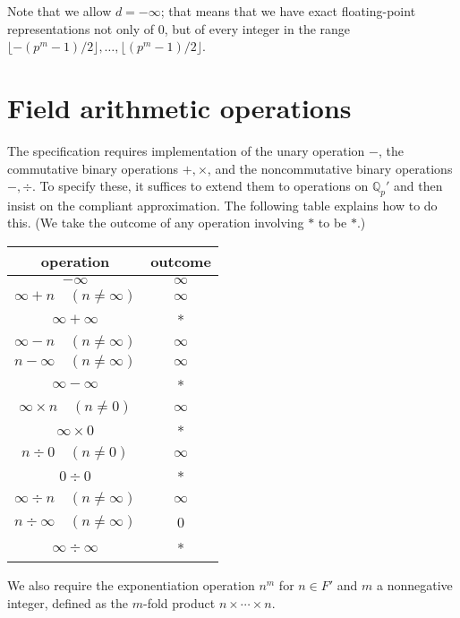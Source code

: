 \documentclass[12pt]{article}
\def\QQ{\mathbb{Q}}
\begin{document}
Note that we allow $d = -\infty$; that means that we have exact floating-point
representations not only of $0$, but of every integer in the range
$\lfloor -(p^{m}-1)/2 \rfloor, \dots, \lfloor (p^m-1)/2 \rfloor$.

\section{Field arithmetic operations}

The specification requires implementation of the unary operation
$-$, the commutative binary operations $+, \times$,
and the noncommutative binary operations $-, \div$.
To specify these, it suffices to extend them to operations on $\QQ_p'$
and then insist on the compliant approximation. The following
table explains how to do this. (We take the outcome of any operation
involving $*$ to be $*$.)

\begin{center}
\begin{tabular}{c|c} \\
operation & outcome \\
\hline
$-\infty$ & $\infty$ \\
$\infty + n \quad (n \neq \infty)$ & $\infty$ \\
$\infty + \infty$ & * \\
$\infty - n \quad (n \neq \infty)$ & $\infty$ \\
$n - \infty  \quad (n \neq \infty)$ & $\infty$ \\
$\infty - \infty$ & * \\
$\infty \times n \quad (n \neq 0)$ & $\infty$ \\
$\infty \times 0$ & * \\
$n \div 0 \quad (n \neq 0)$ & $\infty$ \\
$0 \div 0$ & * \\
$\infty \div n \quad (n \neq \infty)$ & $\infty$ \\
$n \div \infty \quad (n \neq \infty)$ & 0 \\
$\infty \div \infty$ & * \\
\end{tabular}
\end{center}

We also require the exponentiation operation $n^m$ for $n \in F'$
and $m$ a nonnegative integer, defined as the $m$-fold product 
$n \times \cdots \times n$.
\end{document}
